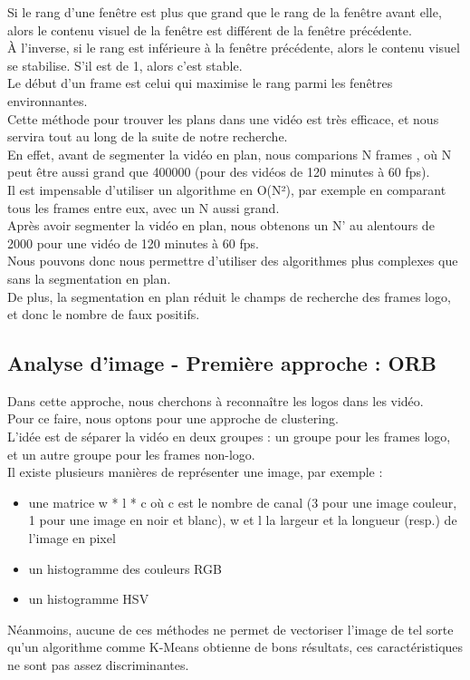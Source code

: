 \documentclass[11pt]{article}
\begin{document}
Si le rang d'une fenêtre est plus que grand que le rang de la fenêtre avant elle, alors le contenu visuel de la fenêtre est différent de la fenêtre précédente.\\
À l'inverse, si le rang est inférieure à la fenêtre précédente, alors le contenu visuel se stabilise. S'il est de 1, alors c'est stable.\\

Le début d'un frame est celui qui maximise le rang parmi les fenêtres environnantes.\\

Cette méthode pour trouver les plans dans une vidéo est très efficace, et nous servira tout au long de la suite de notre recherche.\\

En effet, avant de segmenter la vidéo en plan, nous comparions  N frames , où N peut être aussi grand que 400000 (pour des vidéos de 120 minutes à 60 fps).\\
Il est impensable d’utiliser un algorithme en O(N²), par exemple en comparant tous les frames entre eux, avec un N aussi grand.\\

Après avoir segmenter la vidéo en plan, nous obtenons un N’ au alentours de 2000 pour une vidéo de 120 minutes à 60 fps.\\
Nous pouvons donc nous permettre d’utiliser des algorithmes plus complexes que sans la segmentation en plan.\\
De plus, la segmentation en plan réduit le champs de recherche des frames logo, et donc le nombre de faux positifs.\\

\subsection{Analyse d'image - Première approche : ORB}
\label{sec:orgd9c53fa}
Dans cette approche, nous cherchons à reconnaître les logos dans les vidéo.\\
Pour ce faire, nous optons pour une approche de clustering.\\
L'idée est de séparer la vidéo en deux groupes : un groupe pour les frames logo, et un autre groupe pour les frames non-logo.\\

Il existe plusieurs manières de représenter une image, par exemple :\\
\begin{itemize}
\item une matrice w * l * c où c est le nombre de canal (3 pour une image couleur, 1 pour une image en noir et blanc), w et l la largeur et la longueur (resp.) de l'image en pixel\\
\item un histogramme des couleurs RGB\\
\item un histogramme HSV\\
\end{itemize}
Néanmoins, aucune de ces méthodes ne permet de vectoriser l'image de tel sorte qu'un algorithme comme K-Means obtienne de bons résultats, ces caractéristiques ne sont pas assez discriminantes.\\
\end{document}

